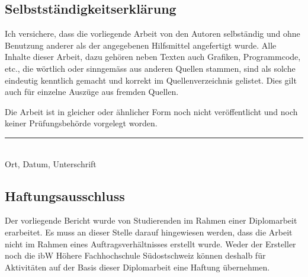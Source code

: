 \begin{appendix}


        \begin{flushleft}
        \chapter*{Selbstständigkeitserklärung}
        Ich versichere, dass die vorliegende Arbeit von den Autoren selbständig und ohne Benutzung anderer als der angegebenen Hilfsmittel angefertigt wurde.
        Alle Inhalte dieser Arbeit, dazu gehören neben Texten auch Grafiken, Programmcode, etc.,
        die wörtlich oder sinngemäss aus anderen Quellen stammen, sind als solche eindeutig kenntlich gemacht und korrekt im Quellenverzeichnis gelistet.
        Dies gilt auch für einzelne Auszüge aus fremden Quellen.
        \end{flushleft}
        \begin{flushleft}
        Die Arbeit ist in gleicher oder ähnlicher Form noch nicht veröffentlicht und noch keiner Prüfungsbehörde vorgelegt worden.

        \vspace{4cm}
        \noindent
        \hrule \ \\[-0.5ex]
        Ort, Datum, Unterschrift
        \end{flushleft}
        \begin{flushleft}
        \chapter*{Haftungsausschluss}
        Der vorliegende Bericht wurde von Studierenden im Rahmen einer Diplomarbeit erarbeitet.
        Es muss an dieser Stelle darauf hingewiesen werden, dass die Arbeit nicht im Rahmen eines Auftragsverhältnisses erstellt wurde.
        Weder der Ersteller noch die ibW Höhere Fachhochschule Südostschweiz können deshalb für Aktivitäten auf der Basis dieser Diplomarbeit eine Haftung übernehmen.
        \end{flushleft}

    \renewcommand{\thesection}{\Roman{section}}
    \renewcommand{\thesubsection}{\thesection.\Roman{subsection}}
    \renewcommand{\thesubsubsection}{\thesubsection.\Roman{subsubsection}}
    \renewcommand{\theparagraph}{\thesubsubsection.\Roman{paragraph}}
    \renewcommand{\thesubparagraph}{\theparagraph.\Roman{subparagraph}}


\end{appendix}
